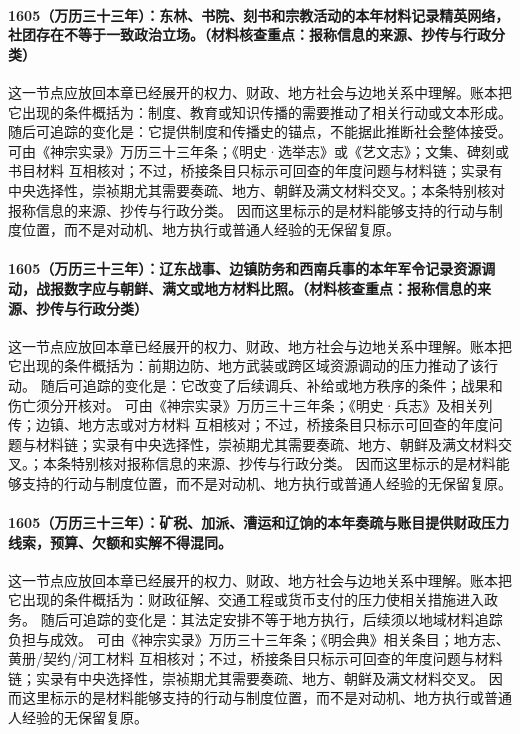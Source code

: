 \paragraph{1605（万历三十三年）：东林、书院、刻书和宗教活动的本年材料记录精英网络，社团存在不等于一致政治立场。（材料核查重点：报称信息的来源、抄传与行政分类）} 这一节点应放回本章已经展开的权力、财政、地方社会与边地关系中理解。账本把它出现的条件概括为：制度、教育或知识传播的需要推动了相关行动或文本形成。 随后可追踪的变化是：它提供制度和传播史的锚点，不能据此推断社会整体接受。 可由《神宗实录》万历三十三年条；《明史·选举志》或《艺文志》；文集、碑刻或书目材料 互相核对；不过，桥接条目只标示可回查的年度问题与材料链；实录有中央选择性，崇祯期尤其需要奏疏、地方、朝鲜及满文材料交叉。；本条特别核对报称信息的来源、抄传与行政分类。 因而这里标示的是材料能够支持的行动与制度位置，而不是对动机、地方执行或普通人经验的无保留复原。

\paragraph{1605（万历三十三年）：辽东战事、边镇防务和西南兵事的本年军令记录资源调动，战报数字应与朝鲜、满文或地方材料比照。（材料核查重点：报称信息的来源、抄传与行政分类）} 这一节点应放回本章已经展开的权力、财政、地方社会与边地关系中理解。账本把它出现的条件概括为：前期边防、地方武装或跨区域资源调动的压力推动了该行动。 随后可追踪的变化是：它改变了后续调兵、补给或地方秩序的条件；战果和伤亡须分开核对。 可由《神宗实录》万历三十三年条；《明史·兵志》及相关列传；边镇、地方志或对方材料 互相核对；不过，桥接条目只标示可回查的年度问题与材料链；实录有中央选择性，崇祯期尤其需要奏疏、地方、朝鲜及满文材料交叉。；本条特别核对报称信息的来源、抄传与行政分类。 因而这里标示的是材料能够支持的行动与制度位置，而不是对动机、地方执行或普通人经验的无保留复原。

\paragraph{1605（万历三十三年）：矿税、加派、漕运和辽饷的本年奏疏与账目提供财政压力线索，预算、欠额和实解不得混同。} 这一节点应放回本章已经展开的权力、财政、地方社会与边地关系中理解。账本把它出现的条件概括为：财政征解、交通工程或货币支付的压力使相关措施进入政务。 随后可追踪的变化是：其法定安排不等于地方执行，后续须以地域材料追踪负担与成效。 可由《神宗实录》万历三十三年条；《明会典》相关条目；地方志、黄册/契约/河工材料 互相核对；不过，桥接条目只标示可回查的年度问题与材料链；实录有中央选择性，崇祯期尤其需要奏疏、地方、朝鲜及满文材料交叉。 因而这里标示的是材料能够支持的行动与制度位置，而不是对动机、地方执行或普通人经验的无保留复原。

